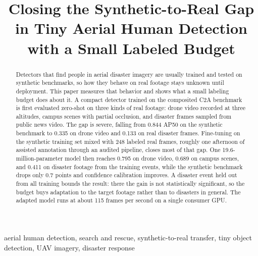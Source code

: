 \documentclass[conference,a4paper]{IEEEtran}
\begin{document}
\title{Closing the Synthetic-to-Real Gap in Tiny Aerial Human Detection
with a Small Labeled Budget}

\author{
}

\maketitle

\begin{abstract}
Detectors that find people in aerial disaster imagery are usually trained and
tested on synthetic benchmarks, so how they behave on real footage stays
unknown until deployment. This paper measures that behavior and shows what a
small labeling budget does about it. A compact detector trained on the
composited C2A benchmark is first evaluated zero-shot on three kinds of real
footage: drone video recorded at three altitudes, campus scenes with partial
occlusion, and disaster frames sampled from public news video. The gap is
severe, falling from 0.844 AP50 on the synthetic benchmark to 0.335 on drone
video and 0.133 on real disaster frames. Fine-tuning on the synthetic training
set mixed with 248 labeled real frames, roughly one afternoon of assisted
annotation through an audited pipeline, closes most of that gap. One
19.6-million-parameter model then reaches 0.795 on drone video, 0.689 on campus
scenes, and 0.411 on disaster footage from the training events, while the
synthetic benchmark drops only 0.7 points and confidence calibration improves.
A disaster event held out from all training bounds the result: there the gain is
not statistically significant, so the budget buys adaptation to the target
footage rather than to disasters in general. The adapted model runs at about
115 frames per second on a single consumer GPU.
\end{abstract}

\begin{IEEEkeywords}
aerial human detection, search and rescue, synthetic-to-real transfer, tiny
object detection, UAV imagery, disaster response
\end{IEEEkeywords}
\end{document}

